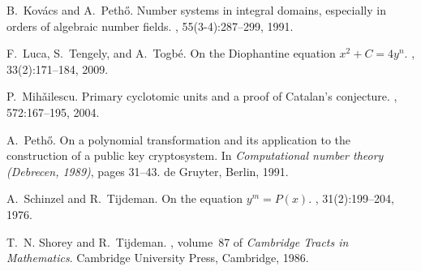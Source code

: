 \begin{thebibliography}{10}
B.~Kov{\'a}cs and A.~Peth{\H{o}}.
\newblock Number systems in integral domains, especially in orders of algebraic
  number fields.
, 55(3-4):287--299, 1991.

F.~Luca, S.~Tengely, and A.~Togb{\'e}.
\newblock On the {D}iophantine equation {$x^2+C=4y^n$}.
, 33(2):171--184, 2009.

P.~Mih{\v{a}}ilescu.
\newblock Primary cyclotomic units and a proof of {C}atalan's conjecture.
, 572:167--195, 2004.

A.~Peth{\H o}.
\newblock On a polynomial transformation and its application to the
  construction of a public key cryptosystem.
\newblock In {\em Computational number theory ({D}ebrecen, 1989)}, pages
  31--43. de Gruyter, Berlin, 1991.

A.~Schinzel and R.~Tijdeman.
\newblock On the equation {$y^{m}=P(x)$}.
, 31(2):199--204, 1976.

T.~N. Shorey and R.~Tijdeman.
, volume~87 of {\em
  Cambridge Tracts in Mathematics}.
\newblock Cambridge University Press, Cambridge, 1986.

\end{thebibliography}
\documentclass{amsart}
\usepackage{amsmath,amsfonts,amssymb,latexsym}
\usepackage{graphicx}
\usepackage{fancyhdr}
\usepackage{multirow}


\usepackage{cite}

\usepackage{hyperref}


\newcommand{\R}{{\mathbb R}}
\newcommand{\Q}{{\mathbb Q}}
\newcommand{\C}{{\mathbb C}}
\newcommand{\N}{{\mathbb N}}
\newcommand{\Z}{{\mathbb Z}}
\renewcommand{\P}{{\mathbb P}}
\newcommand{\ord}{\mathrm{ord}}

\DeclareMathOperator{\Rad}{Rad}
\DeclareMathOperator{\Gal}{Gal}
\DeclareMathOperator{\Norm}{N}

\theoremstyle{plain}
\newtheorem{thm}{Theorem}[section]
\newtheorem{theorem}[thm]{Theorem}
\newtheorem{example}[thm]{Example}
\newtheorem{lemma}[thm]{Lemma}
\newtheorem{definition}[thm]{Definition}
\newtheorem{proposition}[thm]{Proposition}
\newtheorem{conjecture}[thm]{Conjecture}
\newtheorem{question}[thm]{Question}
\newtheorem{cor}[thm]{Corollary}
\newtheorem{con}[thm]{Conjecture}

